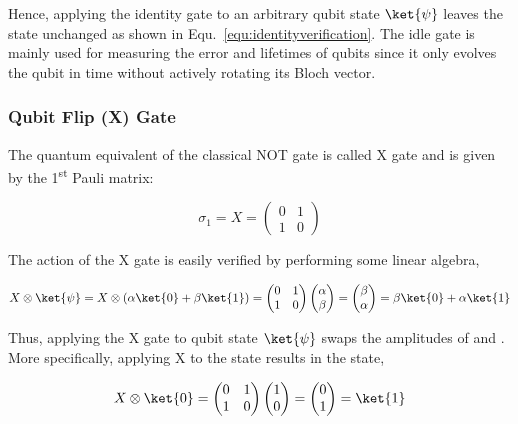Hence, applying the identity gate to an arbitrary qubit state $\ket{\psi}$ leaves the state unchanged as shown in Equ.~\ref{equ:identityverification}. The idle gate is mainly used for measuring the error and lifetimes of qubits since it only evolves the qubit in time without actively rotating its Bloch vector.

\subsubsection{Qubit Flip (X) Gate}
\label{subsubsubsec:xgate}

The quantum equivalent of the classical NOT gate is called X gate and is given by the 1\textsuperscript{st} Pauli matrix:

\begin{equation}
\sigma_{1} = X = \begin{pmatrix}
 0 & 1 \\ 
 1 & 0
 \end{pmatrix}
\end{equation}

The action of the X gate is easily verified by performing some linear algebra,

\begin{equation}
\label{equ:xverification1}
X \otimes \ket{\psi} = X \otimes (\alpha \ket{0} + \beta \ket{1}) = \begin{pmatrix}
 0 & 1 \\ 
 1 & 0
 \end{pmatrix} \begin{pmatrix}
 \alpha  \\ 
 \beta
 \end{pmatrix} = \begin{pmatrix}
 \beta  \\ 
 \alpha
 \end{pmatrix} = \beta \ket{0} + \alpha \ket{1}
\end{equation}

Thus, applying the X gate to qubit state $\ket{\psi}$ swaps the amplitudes of \0 and \1. More specifically, applying X to the \0 state results in the \1 state,

\begin{equation}
\label{equ:xverification2}
X \otimes \ket{0} = \begin{pmatrix}
 0 & 1 \\ 
 1 & 0
 \end{pmatrix} \begin{pmatrix}
 1  \\ 
 0
 \end{pmatrix} = \begin{pmatrix}
 0  \\ 
 1 \end{pmatrix} =  \ket{1}
\end{equation}

